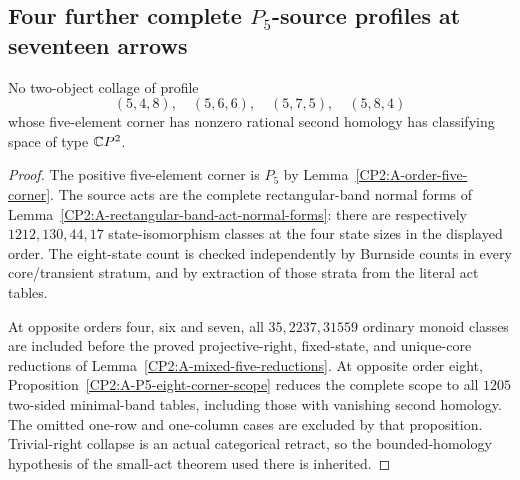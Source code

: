 \subsection{Four further complete $P_5$-source profiles at seventeen arrows}

\begin{proposition}
\label{CP2:A-P5-source-seventeen}
No two-object collage of profile
\[
(5,4,8),\quad(5,6,6),\quad(5,7,5),\quad(5,8,4)
\]
whose five-element corner has nonzero rational second
homology has classifying space of type $\mathbb{C}P^2$.
\end{proposition}
\begin{proof}
The positive five-element corner is $P_5$ by
Lemma~\ref{CP2:A-order-five-corner}.
The source acts are the complete rectangular-band normal
forms of Lemma~\ref{CP2:A-rectangular-band-act-normal-forms}:
there are respectively $1212,130,44,17$ state-isomorphism
classes at the four state sizes in the displayed order.
The eight-state count is checked independently by Burnside
counts in every core/transient stratum, and by extraction
of those strata from the literal act tables.

At opposite orders four, six and seven, all $35,2237,31559$
ordinary monoid classes are included before the proved
projective-right, fixed-state, and unique-core reductions
of Lemma~\ref{CP2:A-mixed-five-reductions}. At opposite
order eight, Proposition~\ref{CP2:A-P5-eight-corner-scope}
reduces the complete scope to all $1205$ two-sided minimal-band
tables, including those with vanishing second homology.
The omitted one-row and one-column cases are excluded by
that proposition. Trivial-right collapse is an actual
categorical retract, so the bounded-homology hypothesis of
the small-act theorem used there is inherited.


\end{proof}
